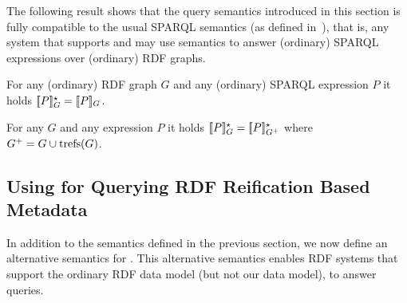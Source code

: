 \noindent
{}

The following result shows that the query semantics introduced in this section is fully compatible to the usual SPARQL semantics (as defined in~\cite{Perez09:SemanticsAndComplexityOfSPARQL}), that is, any system that supports {\RDFplus}
	and {\SPARQLplus}
may use {\SPARQLplus} semantics to answer (ordinary) SPARQL expressions over (ordinary) RDF graphs.

\begin{proposition} \label{Proposition:EquivalenceOfSemantics}
	For any (ordinary) RDF graph $G$ and any (ordinary) SPARQL expression $P$ it holds $[\![P]\!]^\star_{G} = [\![P]\!]_{G}$.
\end{proposition}


\begin{proposition}
	For any {\RDFplusGraph} $G$ and any {\SPARQLplus} expression $P$ it holds $[\![P]\!]^\star_{G} = [\![P]\!]^\star_{G^+}$ where $G^+ = G \cup \mathrm{trefs}(G)$.
\end{proposition}



\subsection{Using {\SPARQLplus} for Querying RDF Reification Based Metadata}
	In addition to the {\SPARQLplus} semantics defined in the previous section, we now define an alternative semantics for {\SPARQLplus}. This alternative semantics enables RDF systems that support the ordinary RDF data model (but not our {\RDFplus} data model), to answer {\SPARQLplus} queries.


